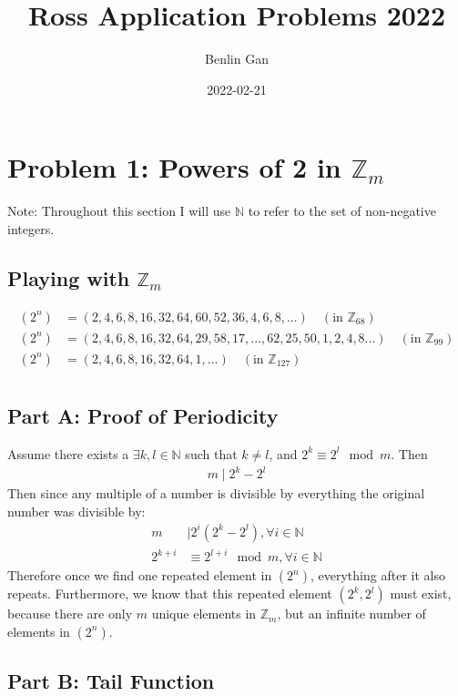 \documentclass{article}
\title{Ross Application Problems 2022}
\date{2022-02-21}
\author{Benlin Gan}
\begin{document}
  \maketitle
  \newpage
  \section{Problem 1: Powers of 2 in $\mathbb{Z}_m$}
  Note: Throughout this section I will use $\mathbb{N}$ to refer to the set of non-negative integers.
  \subsection{Playing with $\mathbb{Z}_m$}
  \begin{align*}
    (2^n) &= (2, 4, 6, 8, 16, 32, 64, 60, 52, 36, 4, 6, 8, ...)   \hspace{1em}  (\textrm{in } \mathbb{Z}_{68})\\
    (2^n) &= (2, 4, 6, 8, 16, 32, 64, 29, 58, 17, ..., 62, 25, 50, 1, 2, 4, 8 ...) \hspace{1em}     (\textrm{in } \mathbb{Z}_{99})\\
    (2^n) &= (2, 4, 6, 8, 16, 32, 64, 1, ...) \hspace{1em}     (\textrm{in } \mathbb{Z}_{127})\\
  \end{align*}
  \subsection{Part A: Proof of Periodicity}
  Assume there exists a $\exists k, l \in \mathbb{N}$ such that $k \neq l$, and $2^k \equiv 2^l \mod m$. Then
  \begin{align}
    m \mid 2^k - 2^l 
  \end{align}
  Then since any multiple of a number is divisible by everything the original number was divisible by:
  \begin{align}
    m &\mid 2^i(2^k-2^l), \forall i \in \mathbb{N}\\
    2^{k+i} &\equiv 2^{l+i} \mod m, \forall i \in \mathbb{N}
  \end{align}
  Therefore once we find one repeated element in $(2^n)$, everything after it also repeats. Furthermore, we know that this repeated element $(2^k, 2^l)$ must exist, because there are only $m$ unique elements in $\mathbb{Z}_m$, but an infinite number of elements in $(2^n)$.
  \subsection{Part B: Tail Function}
\end{document}
